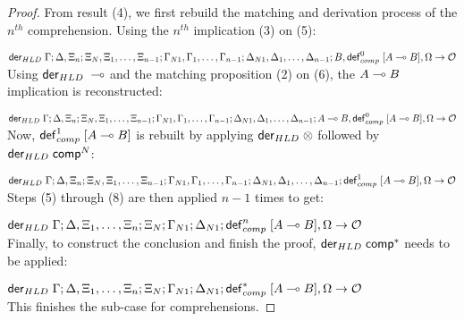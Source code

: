 \begin{proof}
\noindent From result (4), we first rebuild the matching and derivation process of the
$n^{th}$ comprehension.  Using the $n^{th}$ implication (3) on (5):

\noindent $\mathsf{der}_{HLD} \; \Gamma; \Delta, \Xi_n; \Xi_N, \Xi_1, \dotsc, \Xi_{n-1}; \Gamma_{N1}, \Gamma_1,
\dotsc, \Gamma_{n-1}; \Delta_{N1}, \Delta_1, \dotsc, \Delta_{n-1}; B, \mathsf{def}_{comp}^{0} \; [A \multimap B],
\Omega \rightarrow \mathcal{O}$ \\

\noindent Using $\mathsf{der}_{HLD} \; \multimap$ and the matching proposition (2) on (6), the $A \multimap B$
implication is reconstructed:

\noindent $\mathsf{der}_{HLD} \; \Gamma; \Delta, \Xi_n; \Xi_N, \Xi_1, \dotsc, \Xi_{n-1}; \Gamma_{N1},
   \Gamma_1, \dotsc, \Gamma_{n-1}; \Delta_{N1}, \Delta_1, \dotsc, \Delta_{n-1};
A \multimap B, \mathsf{def}_{comp}^{0} \; [A \multimap B], \Omega \rightarrow \mathcal{O}$ \\

\noindent Now, $\mathsf{def}_{comp}^{1} \; [A \multimap B]$ is rebuilt by applying $\mathsf{der}_{HLD} \; \otimes$ followed by $\mathsf{der}_{HLD} \;
\mathsf{comp}^N$:

\noindent $\mathsf{der}_{HLD} \; \Gamma; \Delta, \Xi_n; \Xi_N, \Xi_1, \dotsc, \Xi_{n-1}; \Gamma_{N1},
\Gamma_1, \dotsc, \Gamma_{n-1}; \Delta_{N1}, \Delta_1, \dotsc, \Delta_{n-1};
\mathsf{def}_{comp}^{1} \; [A \multimap B], \Omega \rightarrow \mathcal{O}$ \\

\noindent Steps (5) through (8) are then applied $n-1$ times to get:

\noindent $\mathsf{der}_{HLD} \; \Gamma; \Delta, \Xi_1, \dotsc, \Xi_n; \Xi_N; \Gamma_{N1}; \Delta_{N1};
\mathsf{def}_{comp}^{n} \; [A \multimap B], \Omega \rightarrow \mathcal{O}$ \\

\noindent Finally, to construct the conclusion and finish the proof, $\mathsf{der}_{HLD} \; \mathsf{comp}^*$ needs to
be applied:

\noindent $\mathsf{der}_{HLD} \; \Gamma; \Delta, \Xi_1, \dotsc, \Xi_n; \Xi_N; \Gamma_{N1}; \Delta_{N1};
\mathsf{def}_{comp}^{*} \; [A \multimap B], \Omega \rightarrow \mathcal{O}$ \\

\noindent This finishes the sub-case for comprehensions.

\end{proof}
